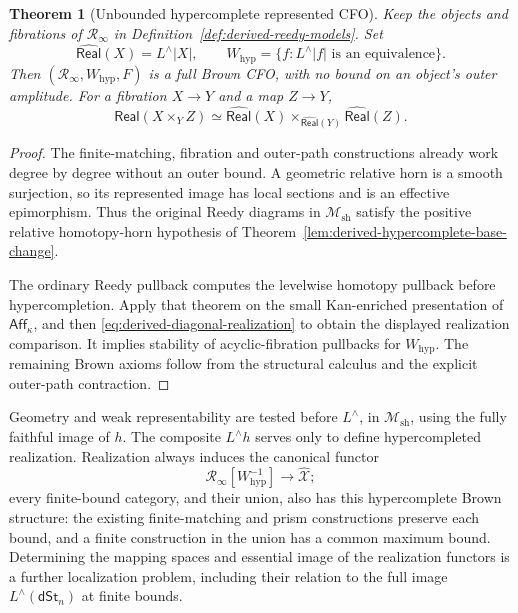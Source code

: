 \documentclass[12pt]{amsart}
\newtheorem{thm}{Theorem}[section]
\theoremstyle{definition}
\theoremstyle{remark}
\numberwithin{equation}{section}
\newcommand{\CM}{\mathcal M}
\newcommand{\Aff}{\mathsf{Aff}}
\newcommand{\dSt}{\mathsf{dSt}}
\begin{document}
\begin{thm}[Unbounded hypercomplete represented CFO]
Keep the objects and fibrations of $\mathscr R_\infty$
in Definition~\ref{def:derived-reedy-models}.
\label{thm:derived-reedy-hypercomplete}
Set
\[
 \widehat{\mathsf{Real}}(X)=L^\wedge|X|,
 \qquad
 W_{\mathrm{hyp}}
 =\{f:L^\wedge|f|\text{ is an equivalence}\}.
\]
Then $(\mathscr R_\infty,W_{\mathrm{hyp}},F)$ is a full
Brown CFO, with no bound on an object's outer amplitude.
For a fibration $X\to Y$ and a map $Z\to Y$,
\[
 \widehat{\mathsf{Real}}(X\times_Y Z)
 \simeq
 \widehat{\mathsf{Real}}(X)
 \times_{\widehat{\mathsf{Real}}(Y)}
 \widehat{\mathsf{Real}}(Z).
\]
\end{thm}

\begin{proof}
The finite-matching, fibration and outer-path constructions
already work degree by degree without an outer bound.
A geometric relative horn is a smooth surjection, so its
represented image has local sections and is an effective
epimorphism. Thus the original Reedy diagrams in
$\CM_{\mathrm{sh}}$ satisfy the positive relative
homotopy-horn hypothesis of
Theorem~\ref{lem:derived-hypercomplete-base-change}.

The ordinary Reedy pullback computes the levelwise
homotopy pullback before hypercompletion. Apply
that theorem on the small Kan-enriched presentation
of $\Aff_\kappa$, and then
\eqref{eq:derived-diagonal-realization} to obtain the
displayed realization comparison. It implies stability
of acyclic-fibration pullbacks for $W_{\mathrm{hyp}}$.
The remaining Brown axioms follow from the structural
calculus and the explicit outer-path contraction.
\end{proof}

Geometry and weak representability are tested before
$L^\wedge$, in $\CM_{\mathrm{sh}}$, using the fully
faithful image of $h$. The composite $L^\wedge h$
serves only to define hypercompleted realization.
Realization always induces the canonical functor
\[
 \mathscr R_\infty[W_{\mathrm{hyp}}^{-1}]
 \longrightarrow\widehat{\mathcal X};
\]
every finite-bound category, and their union, also has
this hypercomplete Brown structure: the existing
finite-matching and prism constructions preserve each
bound, and a finite construction in the union has a
common maximum bound. Determining the mapping spaces
and essential image of the realization functors is a
further localization problem, including their relation
to the full image $L^\wedge(\dSt_n)$ at finite bounds.
\end{document}

